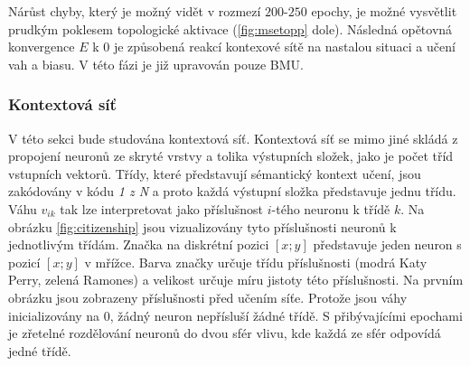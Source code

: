 \documentclass[thesis=M,czech]{FITthesis}[2012/06/26]
\begin{document}
Nárůst chyby, který je možný vidět  v rozmezí $200$-$250$ epochy, je možné vysvětlit prudkým poklesem topologické aktivace (\ref{fig:msetopp} dole). Následná opětovná konvergence $E$ k 0 je způsobená reakcí kontexové sítě na nastalou situaci a učení vah a biasu. V této fázi je již upravován pouze BMU.









\subsubsection*{Kontextová síť}
V této sekci bude studována kontextová síť. Kontextová síť se mimo jiné skládá z propojení neuronů ze skryté vrstvy a tolika výstupních složek, jako je počet tříd vstupních vektorů. Třídy, které představují sémantický kontext učení, jsou zakódovány v kódu \textit{1 z N} a proto každá výstupní složka představuje jednu třídu. Váhu  $v_{ik}$ tak lze interpretovat jako příslušnost $i$-tého neuronu k třídě $k$. 
Na obrázku \ref{fig:citizenship} jsou vizualizovány tyto příslušnosti neuronů k jednotlivým třídám. Značka na diskrétní pozici $[x;y]$ představuje jeden neuron s pozicí $[x;y]$ v mřížce. Barva značky určuje třídu příslušnosti (modrá Katy Perry, zelená Ramones) a velikost určuje míru jistoty této příslušnosti.
Na prvním obrázku jsou zobrazeny příslušnosti před učením síťe. Protože jsou váhy inicializovány na $0$, žádný neuron nepřísluší žádné třídě. S přibývajícími epochami je zřetelné rozdělování neuronů do dvou sfér vlivu, kde každá ze sfér odpovídá jedné třídě. 
\end{document}
